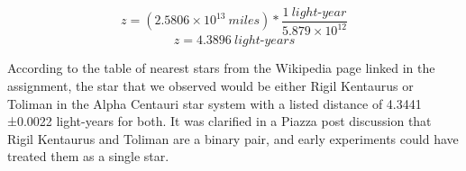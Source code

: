 \documentclass[12pt]{report}
\begin{document}
\begin{enumerate}
  \[z=(2.5806\times 10^{13}\ miles) * \frac{1\ light\text{-}year}{5.879\times
      10^{12}}\]
  \[z=4.3896\ light\text{-}years\]

  According to the table of nearest stars from the Wikipedia page linked in the
  assignment, the star that we observed would be either Rigil Kentaurus or
  Toliman in the Alpha Centauri star system with a listed distance of 4.3441
  ±0.0022 light-years for both. It was clarified in a Piazza post discussion
  that Rigil Kentaurus and Toliman are a binary pair, and early experiments
  could have treated them as a single star.








\end{enumerate}
\end{document}
